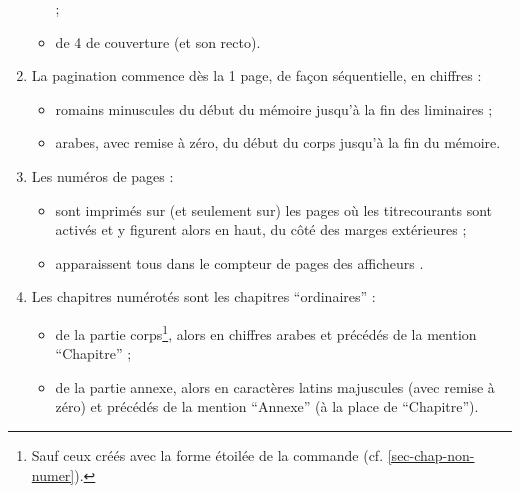 \begin{enumerate}
\begin{itemize}
{    } ;
  \item de 4\ieme{} de couverture (et son recto).
  \end{itemize}
\item La \gls{pagination} commence dès la 1\iere{} page, de façon
  séquentielle, en chiffres :
  \begin{itemize}
  \item romains minuscules du début du mémoire jusqu'à la fin des
    \glspl{liminaire} ;
  \item arabes, avec remise à zéro, du début du corps jusqu'à la fin du
    mémoire.
  \end{itemize}
\item Les numéros de pages :
  \begin{itemize}
  \item sont imprimés sur (et seulement sur) les pages où les
    \glspl{titrecourant} sont activés et y figurent alors en haut, du côté des
    marges extérieures ;
  \item apparaissent tous dans le compteur de pages des afficheurs
    \pdf{}.
  \end{itemize}
\item Les chapitres numérotés sont les chapitres \enquote{ordinaires} :
  \begin{itemize}
  \item de la partie corps\footnote{Sauf ceux créés avec la forme étoilée de la
      commande  (cf. \vref{sec-chap-non-numer}).}, alors
    en chiffres arabes et précédés de la mention \enquote{Chapitre} ;
  \item de la partie annexe, alors en caractères latins majuscules (avec remise
    à zéro) et précédés de la mention \enquote{Annexe} (à la place de \enquote{Chapitre}).
  \end{itemize}
\end{enumerate}

%
\iffalse
\fi
